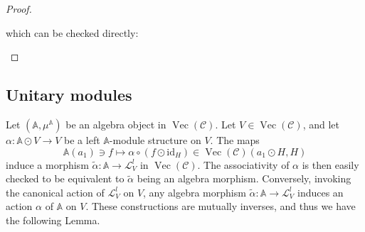 \documentclass[a4paper,11pt,reqno]{amsart}
\numberwithin{equation}{section}
\theoremstyle{remark}
\theoremstyle{definition}
\newcommand{\bA}{\mathbb A}
\newcommand{\cC}{\mathcal C}
\newcommand{\cL}{\mathcal L}
\DeclareMathOperator{\Vect}{Vec}
\newcommand{\id}{\mathrm{id}}
\newcommand{\Hilb}{\mathrm{Hilb}}
\begin{document}
\begin{proof}
\begin{center}
    \end{center}
which can be checked directly:
    \begin{center}
    \end{center}
\end{proof}




\subsection{Unitary modules}

Let $(\bA, \mu^\bA)$ be an algebra object in $\Vect(\cC)$. Let $V \in \Vect(\cC)$, and let $\alpha: \bA \odot V \to V$ be a left $\bA$-module structure on $V$.  
The maps
\[
\bA(a_1) \ni f \mapsto \alpha \circ (f \odot \id_H) \in \Vect(\cC)(a_1 \odot H, H)
\]
induce a morphism $\tilde{\alpha}: \bA \to \cL_V^l$ in $\Vect(\cC)$. The associativity of $\alpha$ is then easily checked to be equivalent to $\tilde{\alpha}$ being an algebra morphism. Conversely, invoking the canonical action of $\cL_V^l$ on $V$, any algebra morphism $\tilde{\alpha}: \bA \to \cL_V^l$ induces an action $\alpha$ of $\bA$ on $V$. These constructions are mutually inverses, and thus we have the following Lemma.
\end{document}
